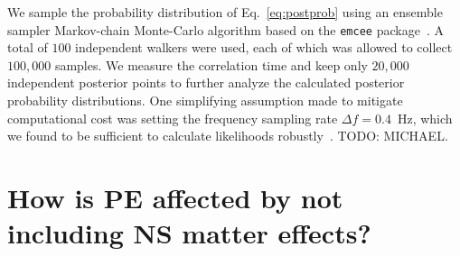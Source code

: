 \documentclass[aps,prd,amsmath,floats,floatfix, twocolumn,
superscriptaddress,nofootinbib,showpacs]{revtex4-1}
\newcommand{\prayush}{\textcolor{red!40!black}}
\begin{document}
We sample the probability distribution of Eq.~\ref{eq:postprob} using
an ensemble sampler Markov-chain Monte-Carlo algorithm based on the {\tt emcee}
package~. A total of $100$ independent walkers were used, each of which
was allowed to collect $100,000$ samples. We measure the correlation time and keep
only $20,000$ independent posterior points to further analyze the calculated 
posterior probability distributions. One simplifying assumption made to mitigate 
computational cost was setting the frequency sampling rate $\Delta f=0.4$~Hz, which
we found to be sufficient to calculate likelihoods robustly~\cite{Purrer:2015nkh}.
\prayush{TODO: MICHAEL}.




\section{How is PE affected by not including NS matter effects?}\label{s1:PEwithnoNS}
\end{document}
